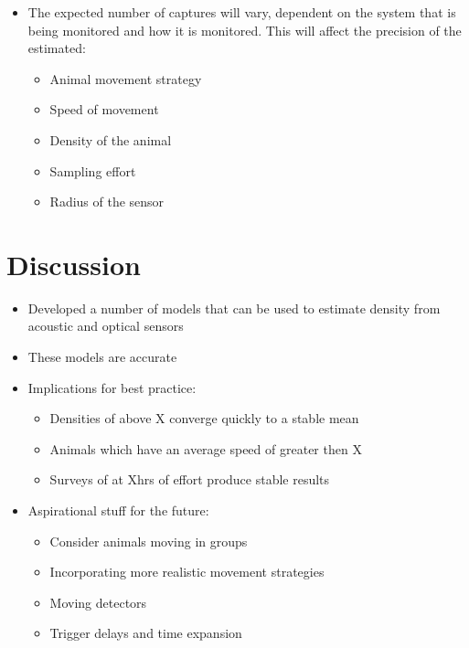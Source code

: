 \documentclass[a4paper,10pt,reqno,oneside]{amsart}
\begin{document}
\begin{itemize}
\item The expected number of captures will vary, dependent on the system that is being monitored and how it is monitored. This will affect the precision of the estimated: 
	\begin{itemize}
	\item Animal movement strategy
	\item Speed of movement
	\item Density of the animal
	\item Sampling effort
	\item Radius of the sensor
	\end{itemize}
\end{itemize}


\section{Discussion}
\begin{itemize}
\item Developed a number of models that can be used to estimate density from acoustic and optical sensors 
\item These models are accurate 
\item Implications for best practice:
	\begin{itemize}
	\item Densities of above X converge quickly to a stable mean
	\item Animals which have an average speed of greater then X 
	\item Surveys of at Xhrs of effort produce stable results
	\end{itemize}
\item Aspirational stuff for the future:
	\begin{itemize}
	\item Consider animals moving in groups
	\item Incorporating more realistic movement strategies
	\item Moving detectors
	\item Trigger delays and time expansion
	\end{itemize}
\end{itemize}
\end{document}
